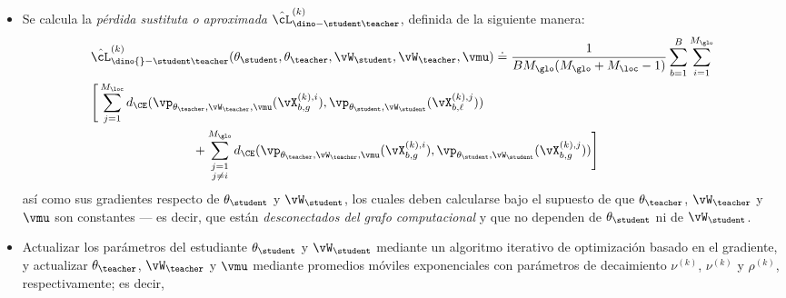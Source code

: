 \documentclass[../../book-main_es.tex]{subfiles}
\begin{document}
\begin{itemize}
\begin{align}
            (f_{\theta_{\teacher}}^{\ext} \circ
            f_{\theta_{\teacher}})(\vX_{b, g}^{(k), i}), \\
            &\vp_{\theta_{\teacher}, \vW_{\teacher}, \vmu}(\vX_{b,
            g}^{(k), i}) \doteq h_{\vW_{\teacher},
            \vmu}(\vZ_{\theta_{\teacher}}(\vX_{b, g}^{(k), i})).
        \end{align}
    \item Se calcula la \textit{pérdida sustituta o aproximada}
        \(\hat{\cL}_{\dino-\student\teacher}^{(k)}\), definida de la siguiente manera:
        \begin{align}\label{eq:dino_loss_teacherstudent_empirical}
            &\hat{\cL}_{\dino{}-\student\teacher}^{(k)}(\theta_{\student},
            \theta_{\teacher}, \vW_{\student}, \vW_{\teacher}, \vmu) \doteq
            \frac{1}{BM_{\glo}(M_{\glo} + M_{\loc} - 1)}\sum_{b =
            1}^{B}\sum_{i = 1}^{M_{\glo}}\\
            &\Bigg[\sum_{j =
                1}^{M_{\loc}}d_{\CE}(\vp_{\theta_{\teacher},
                    \vW_{\teacher}, \vmu}(\vX_{b, g}^{(k), i}),
                    \vp_{\theta_{\student}, \vW_{\student}}(\vX_{b,
                \ell}^{(k), j})) \\
                &\qquad \qquad \qquad \qquad + \sum_{\substack{j = 1 \\ j \neq
                i}}^{M_{\glo}}d_{\CE}(\vp_{\theta_{\teacher},
                    \vW_{\teacher}, \vmu}(\vX_{b, g}^{(k), i}),
                    \vp_{\theta_{\student}, \vW_{\student}}(\vX_{b, g}^{(k),
            j}))\Bigg]
        \end{align}
        así como sus gradientes respecto de
        \(\theta_{\student}\) y \(\vW_{\student}\), los cuales deben
        calcularse bajo el supuesto de que \(\theta_{\teacher}\),
        \(\vW_{\teacher}\) y \(\vmu\) son constantes --- es decir, que
        están \textit{desconectados del grafo computacional} y que no
        dependen de \(\theta_{\student}\) ni de \(\vW_{\student}\).
    \item Actualizar los parámetros del estudiante
        \(\theta_{\student}\) y \(\vW_{\student}\) mediante un
        algoritmo iterativo de optimización basado en el gradiente,
        y actualizar \(\theta_{\teacher}\), \(\vW_{\teacher}\) y
        \(\vmu\) mediante promedios móviles exponenciales con
        parámetros de decaimiento \(\nu^{(k)}\), \(\nu^{(k)}\) y
        \(\rho^{(k)}\), respectivamente; es decir,
        \begin{align}

\end{align}
\end{itemize}
\end{document}
